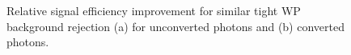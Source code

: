 \begin{figure}[htbp]
    \centering
	\begin{tcolorbox}[colback=black!5!white,colframe=white!75!black]
    \caption{Relative signal efficiency improvement for similar tight WP background rejection (a) for unconverted photons and (b) converted photons.}
    \label{fig:gamma:CNN:Validation:Imp}
    \end{tcolorbox}
    
\end{figure}

